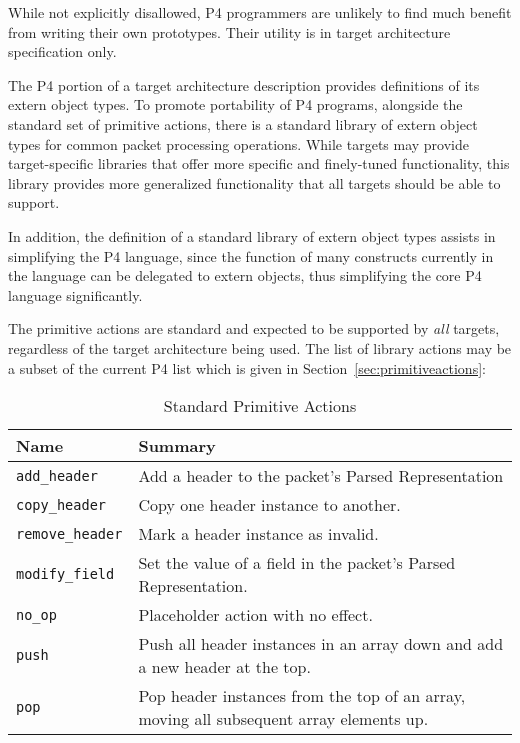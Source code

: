 While not explicitly disallowed, P4 programmers are unlikely to find much
benefit from writing their own prototypes.  Their utility is in target
architecture specification only.


The P4 portion of a target architecture description provides
definitions of its extern object types.
To promote portability of P4 programs, alongside the standard set of primitive
actions, there is a standard library of extern object types
for common packet processing operations.  While targets may provide
target-specific libraries that offer more specific and finely-tuned
functionality, this library provides more generalized functionality that
all targets should be able to support.

In addition, the definition of a standard library of extern object types
assists in simplifying the P4 language, since the function of many constructs
currently in the language can be delegated to extern objects, thus simplifying
the core P4 language significantly.


The primitive actions are standard and expected to be supported
by \textit{all} targets, regardless of the target architecture being used.
The list of library actions may be a subset of the current P4 list which
is given in Section~\ref{sec:primitiveactions}:

\begin{table}[H]
\begin{center}
\begin{tabular}{| l | p{} |} \hline
\textbf{Name} &
\textbf{Summary} \\ \hline
\texttt{add_header} &
Add a header to the packet's Parsed Representation \\ \hline
\texttt{copy_header} &
Copy one header instance to another. \\ \hline
\texttt{remove_header} &
Mark a header instance as invalid. \\ \hline
\texttt{modify_field} &
Set the value of a field in the packet's Parsed Representation. \\ \hline
\texttt{no_op} &
Placeholder action with no effect. \\ \hline
\texttt{push} &
Push all header instances in an array down and add a new header at the top. \\ \hline
\texttt{pop} &
Pop header instances from the top of an array, moving all subsequent array elements up. \\ \hline
\end{tabular}
\end{center}
\caption{Standard Primitive Actions}
\label{tab:primitiveactions}
\end{table}


